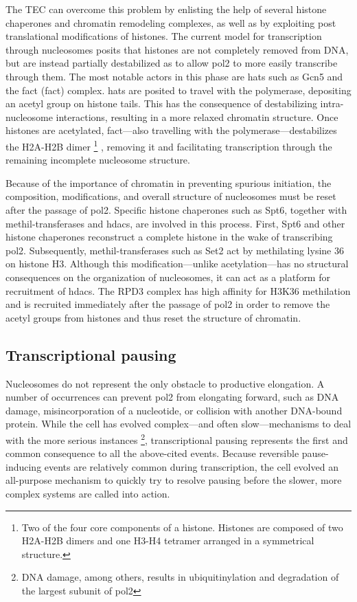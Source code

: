 The TEC can overcome this problem by enlisting the help of several histone chaperones and chromatin remodeling complexes, as well as by exploiting post translational modifications of histones. 
The current model for transcription through nucleosomes posits that histones are not completely removed from DNA, but are instead partially destabilized as to allow \gls{pol2} to more easily transcribe through them.
The most notable actors in this phase are \gls{hats} such as Gcn5 and the \gls{fact} (\glsdesc{fact}) complex. 
\gls{hats} are posited to travel with the polymerase, depositing an acetyl group on histone tails.
This has the consequence of destabilizing intra-nucleosome interactions, resulting in a more relaxed chromatin structure.
Once histones are acetylated, \gls{fact}---also travelling with the polymerase---destabilizes the H2A-H2B dimer \footnote{Two of the four core components of a histone. Histones are composed of two H2A-H2B dimers and one H3-H4 tetramer arranged in a symmetrical structure. } , removing it and facilitating transcription through the remaining incomplete nucleosome structure. 

Because of the importance of chromatin in preventing spurious initiation, the composition, modifications, and overall structure of nucleosomes must be reset after the passage of \gls{pol2}. 
Specific histone chaperones such as Spt6, together with methil-transferases and \gls{hdacs}, are involved in this process.
First, Spt6 and other histone chaperones reconstruct a complete histone in the wake of transcribing \gls{pol2}.
Subsequently, methil-transferases such as Set2 act by methilating lysine 36 on histone H3. 
Although this modification---unlike acetylation---has no structural consequences on the organization of nucleosomes, it can act as a platform for recruitment of \gls{hdacs}.
The RPD3 complex has high affinity for H3K36 methilation and is recruited immediately after the passage of \gls{pol2} in order to remove the acetyl groups from histones and thus reset the structure of chromatin.

\subsection{Transcriptional pausing}
Nucleosomes do not represent the only obstacle to productive elongation.
A number of occurrences can prevent \gls{pol2} from elongating forward, such as DNA damage, misincorporation of a nucleotide, or collision with another DNA-bound protein.
While the cell has evolved complex---and often slow---mechanisms to deal with the more serious instances \footnote{DNA damage, among others, results in ubiquitinylation and degradation of the largest subunit of \gls{pol2}}, transcriptional pausing represents the first and common consequence to all the above-cited events. 
Because reversible pause-inducing events are relatively common during transcription, the cell evolved an all-purpose mechanism to quickly try to resolve pausing before the slower, more complex systems are called into action. 




